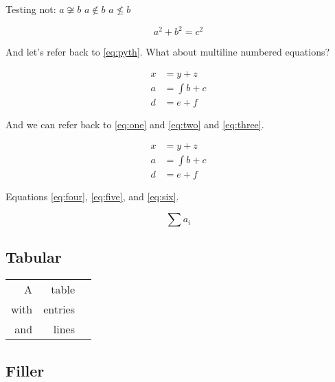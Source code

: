 \documentclass[
  text,
  xhtml,
  itex
]{internet}
\begin{document}
Testing not: \(a \not\cong b\) \(a \not\in b\) \(a \not\le b\)

\begin{equation}
\label{eq:pyth}
a^2 + b^2 = c^2
\end{equation}

And let's refer back to \ref{eq:pyth}.
What about multiline numbered equations?

\begin{align}
\label{eq:one}
x &= y + z \\
\label{eq:two}
a &= \int b + c \\
\label{eq:three}
d &= e + f
\end{align}

And we can refer back to \ref{eq:one} and \ref{eq:two} and \ref{eq:three}.

\begin{align}
\label{eq:four}
x &= y + z \\
\nonumber
\label{eq:five}
a &= \int b + c \\
\label{eq:six}
d &= e + f
\end{align}

Equations \ref{eq:four}, \ref{eq:five}, and \ref{eq:six}.

\begin{equation}
\sum a_i
\end{equation}

\subsection{Tabular}

\begin{tabular}{rrr}
A & table \\
with & entries \\ \hline
and & lines
\end{tabular}

\subsection{Filler}

\lipsum
\end{document}
